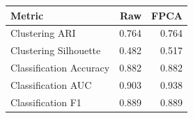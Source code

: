 
\begin{tabular}{lrr}
\toprule
Metric & Raw & FPCA\\
\midrule
Clustering ARI & 0.764 & 0.764\\
Clustering Silhouette & 0.482 & 0.517\\
Classification Accuracy & 0.882 & 0.882\\
Classification AUC & 0.903 & 0.938\\
Classification F1 & 0.889 & 0.889\\
\bottomrule
\end{tabular}
